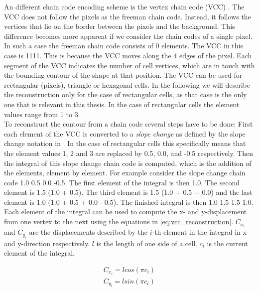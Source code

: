 \documentclass[thesis.tex]{subfiles}
\begin{document}
An different chain code encoding scheme is the vertex chain code (VCC) \cite{vertex_chain_code}. The VCC does not follow the pixels as the freeman chain code. Instead, it follows the vertices that lie on the border between the pixels and the background. This difference becomes more apparent if we consider the chain codes of a single pixel. In such a case the freeman chain code consists of 0 elements. The VCC in this case is 1111. This is because the VCC moves along the 4 edges of the pixel. Each segment of the VCC indicates the number of cell vertices, which are in touch with the bounding contour of the shape at that position. The VCC can be used for rectangular (pixels), triangle or hexagonal cells. In the following we will describe the reconstruction only for the case of rectangular cells, as that case is the only one that is relevant in this thesis. In the case of rectangular cells the element values range from 1 to 3. \\ To reconstruct the contour from a chain code several steps have to be done: First each element of the VCC is converted to a \textit{slope change} as defined by the slope change notation in \cite{slope_change_notation}. In the case of rectangular cells this specifically means that the element values 1, 2 and 3 are replaced by 0.5, 0.0, and -0.5 respectively. Then the integral of this slope change chain code is computed, which is the addition of the elements, element by element. For example consider the slope change chain code 1.0 0.5 0.0 -0.5. The first element of the integral is then 1.0. The second element is 1.5 (1.0 + 0.5). The third element is 1.5 (1.0 + 0.5 + 0.0) and the last element is 1.0 (1.0 + 0.5 + 0.0 - 0.5). The finished integral is then 1.0 1.5 1.5 1.0. Each element of the integral can be used to compute the x- and y-displacement from one vertex to the next using the equations in \ref{eq:vcc_reconstruction}. $C_{x_i}$ and $C_{y_i}$ are the displacements described by the $i$-th element in the integral in x- and y-direction respectively. $l$ is the length of one side of a cell. $c_i$ is the current element of the integral. 

\begin{equation} \label{eq:vcc_reconstruction}
\begin{split} 
C_{x_i} = l  cos(\pi c_i) \\
C_{y_i} = l  sin(\pi c_i) \\
\end{split}
\end{equation}
\end{document}
